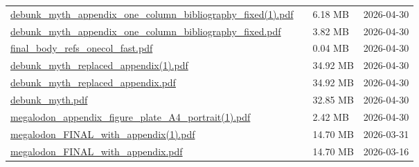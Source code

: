 \documentclass[UTF8,fontset=fandol,10pt,a4paper]{ctexart}
\begin{document}
\begin{longtable}{@{}L{\dimexpr\linewidth-50mm-6\tabcolsep\relax}R{8mm}R{16mm}R{26mm}@{}}
\href{https://chatgpt.com/library?file_id=libfile_6803c220aeac8191aae2abc37a9a9cca&account_id=personal}{debunk\_\allowbreak{}myth\_\allowbreak{}appendix\_\allowbreak{}one\_\allowbreak{}column\_\allowbreak{}bibliography\_\allowbreak{}fixed(1).\allowbreak{}pdf} & \textemdash{} & 6.18 MB & 2026-04-30 \\
\href{https://chatgpt.com/library?file_id=libfile_bbf6918ecd1c8191a28d0107a367ffd4&account_id=personal}{debunk\_\allowbreak{}myth\_\allowbreak{}appendix\_\allowbreak{}one\_\allowbreak{}column\_\allowbreak{}bibliography\_\allowbreak{}fixed.\allowbreak{}pdf} & \textemdash{} & 3.82 MB & 2026-04-30 \\
\href{https://chatgpt.com/library?file_id=libfile_020aeefba88c8191a7b2087cd732460f&account_id=personal}{final\_\allowbreak{}body\_\allowbreak{}refs\_\allowbreak{}onecol\_\allowbreak{}fast.\allowbreak{}pdf} & \textemdash{} & 0.04 MB & 2026-04-30 \\
\href{https://chatgpt.com/library?file_id=libfile_27c1acc663e0819182c65e2df2849273&account_id=personal}{debunk\_\allowbreak{}myth\_\allowbreak{}replaced\_\allowbreak{}appendix(1).\allowbreak{}pdf} & \textemdash{} & 34.92 MB & 2026-04-30 \\
\href{https://chatgpt.com/library?file_id=libfile_df65df0d522881919f5b782b5ab5240e&account_id=personal}{debunk\_\allowbreak{}myth\_\allowbreak{}replaced\_\allowbreak{}appendix.\allowbreak{}pdf} & \textemdash{} & 34.92 MB & 2026-04-30 \\
\href{https://chatgpt.com/library?file_id=libfile_eca6edbc935c8191a2c223d225838f24&account_id=personal}{debunk\_\allowbreak{}myth.\allowbreak{}pdf} & \textemdash{} & 32.85 MB & 2026-04-30 \\
\href{https://chatgpt.com/library?file_id=libfile_6e9ee9ec5f688191ae22eabbefd44cd0&account_id=personal}{megalodon\_\allowbreak{}appendix\_\allowbreak{}figure\_\allowbreak{}plate\_\allowbreak{}A4\_\allowbreak{}portrait(1).\allowbreak{}pdf} & \textemdash{} & 2.42 MB & 2026-04-30 \\
\href{https://chatgpt.com/library?file_id=libfile_8f06bd9136cc8191a99735da7b89bd5a&account_id=personal}{megalodon\_\allowbreak{}FINAL\_\allowbreak{}with\_\allowbreak{}appendix(1).\allowbreak{}pdf} & \textemdash{} & 14.70 MB & 2026-03-31 \\
\href{https://chatgpt.com/library?file_id=libfile_5e2dc0331e708191a83e49afd6d67c6d&account_id=personal}{megalodon\_\allowbreak{}FINAL\_\allowbreak{}with\_\allowbreak{}appendix.\allowbreak{}pdf} & \textemdash{} & 14.70 MB & 2026-03-16 \\

\end{longtable}
\end{document}
